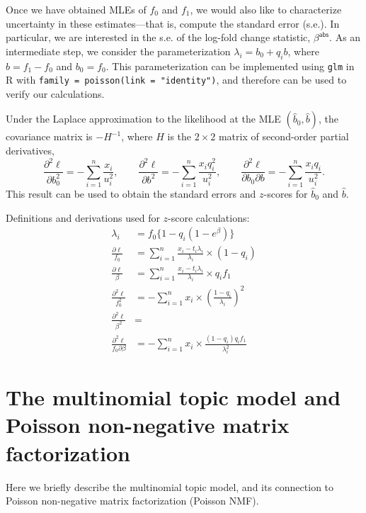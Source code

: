 \documentclass[final]{siamart171218}
\begin{document}
Once we have obtained MLEs of $f_0$ and $f_1$, we would also like to
characterize uncertainty in these estimates---that is, compute the
standard error (s.e.). In particular, we are interested in the s.e. of
the log-fold change statistic, $\beta^{\mathsf{abs}}$. As an
intermediate step, we consider the parameterization $\lambda_i = b_0 +
q_i b$, where $b = f_1 - f_0$ and $b_0 = f_0$. This parameterization
can be implemented using {\tt glm} in R with {\tt family =
  poisson(link = "identity")}, and therefore can be used to verify our
calculations.

Under the Laplace approximation to the likelihood at the MLE
$(\hat{b}_0, \hat{b})$, the covariance matrix is $-H^{-1}$, where $H$
is the $2 \times 2$ matrix of second-order partial derivatives,
\begin{equation*}
\frac{\partial^2\ell}{\partial b_0^2} = 
-\sum_{i=1}^n \frac{x_i}{u_i^2}, \qquad
\frac{\partial^2\ell}{\partial b^2} = 
-\sum_{i=1}^n \frac{x_i q_i^2}{u_i^2}, \qquad
\frac{\partial^2\ell}{\partial b_0 \partial b} = 
-\sum_{i=1}^n \frac{x_i q_i}{u_i^2}.
\end{equation*}
This result can be used to obtain the standard errors and $z$-scores
for $\hat{b}_0$ and $\hat{b}$.

Definitions and derivations used for $z$-score calculations:
\begin{align}
\lambda_i &= f_0\{1 - q_i(1-e^{\beta})\} \\
\frac{\partial\ell}{f_0} &= 
\sum_{i=1}^n \frac{x_i - t_i\lambda_i}{\lambda_i} \times (1-q_i) \\
\frac{\partial\ell}{\beta} &= 
\sum_{i=1}^n \frac{x_i - t_i\lambda_i}{\lambda_i} \times q_i f_1 \\
\frac{\partial^2\ell}{f_0^2} &=
-\sum_{i=1}^n x_i \times \left(\frac{1-q_i}{\lambda_i}\right)^2 \\
\frac{\partial^2\ell}{\beta^2} &= \\
\frac{\partial^2\ell}{f_0\partial\beta} &= 
-\sum_{i=1}^n x_i \times \frac{(1-q_i) q_i f_1}{\lambda_i^2}
\end{align}

\section{The multinomial topic model and Poisson non-negative matrix
  factorization}

Here we briefly describe the multinomial topic model, and its
connection to Poisson non-negative matrix factorization (Poisson NMF).
\end{document}
